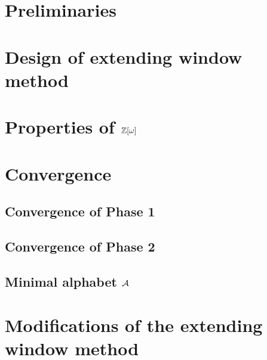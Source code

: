 \documentclass[11pt,a4paper]{report}	%
\theoremstyle{definition}
\begin{document}
\tableofcontents



\chapter{Preliminaries}
	



\chapter{Design of extending window method}
	

\chapter{\texorpdfstring{Properties of $\mathbb{Z}[\omega]$}{Properties of Z[omega]}}
	
	
		
	
\chapter{Convergence}
\label{chap:convergence}

	\section{Convergence of Phase 1}
	

	\section{Convergence of Phase 2}
	
	
	\section{Minimal alphabet $\mathcal{A}$}
	


\chapter{Modifications of the extending window method}
\end{document}
